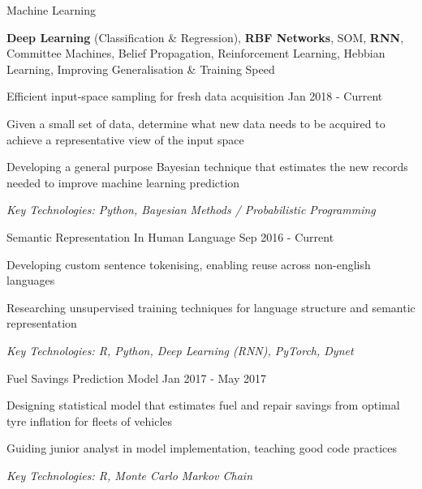 \documentclass[11pt,article,oneside]{memoir}
\newenvironment{itemize*}{%
  \renewcommand\labelitemi{\textbullet}
  \footnotesize
  \begin{itemize}%
    \setlength{\itemsep}{0pt}}%
  {\end{itemize}
}
\begin{document}
\ind Machine Learning 

\ind \hspace{0.354in} \footnotesize \textbf{Deep Learning} (Classification \& Regression), \textbf{RBF Networks}, SOM, \textbf{RNN}, Committee Machines,
Belief Propagation, Reinforcement Learning, Hebbian Learning, Improving Generalisation \& Training Speed \normalsize

\bigskip
 

\normalsize
\medskip
\ind Efficient input-space sampling for fresh data acquisition \hfill Jan 2018 - Current
\begin{itemize*}
  \item Given a small set of data, determine what new data needs to be acquired to achieve a representative view of the input space
  \item Developing a general purpose Bayesian technique that estimates the new records needed to improve machine learning prediction
\end{itemize*}
\ind \hspace{0.35in} \footnotesize \emph{Key Technologies: Python, Bayesian Methods / Probabilistic Programming}

\normalsize
\medskip
\ind Semantic Representation In Human Language \hfill Sep 2016 - Current
\begin{itemize*}
  \item Developing custom sentence tokenising, enabling reuse across non-english languages
  \item Researching unsupervised training techniques for language structure and semantic representation
\end{itemize*}
\ind \hspace{0.35in} \footnotesize \emph{Key Technologies: R, Python, Deep Learning (RNN), PyTorch, Dynet}

\normalsize
\medskip
\ind Fuel Savings Prediction Model \hfill Jan 2017 - May 2017
\begin{itemize*}
  \item Designing statistical model that estimates fuel and repair savings from optimal tyre inflation for fleets of vehicles
  \item Guiding junior analyst in model implementation, teaching good code practices
\end{itemize*}
\ind \hspace{0.35in} \footnotesize \emph{Key Technologies: R, Monte Carlo Markov Chain}
\end{document}
